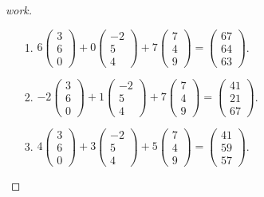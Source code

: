 \begin{question}{1.3}{}
{\begin{enumerate}
\begin{proof}[work]
\begin{enumerate}
          \item[1.] $6\begin{pmatrix}3 \\ 6 \\ 0\end{pmatrix} + 0\begin{pmatrix}-2 \\ 5 \\ 4\end{pmatrix} + 7\begin{pmatrix}7 \\ 4 \\ 9\end{pmatrix} = \begin{pmatrix}67 \\ 64 \\ 63\end{pmatrix}$.
          \item[2.] $-2\begin{pmatrix}3 \\ 6 \\ 0\end{pmatrix} + 1\begin{pmatrix}-2 \\ 5 \\ 4\end{pmatrix} + 7\begin{pmatrix}7 \\ 4 \\ 9\end{pmatrix} = \begin{pmatrix}41 \\ 21 \\ 67\end{pmatrix}$.
          \item[3.] $4\begin{pmatrix}3 \\ 6 \\ 0\end{pmatrix} + 3\begin{pmatrix}-2 \\ 5 \\ 4\end{pmatrix} + 5\begin{pmatrix}7 \\ 4 \\ 9\end{pmatrix} = \begin{pmatrix}41 \\ 59 \\ 57\end{pmatrix}$.

\end{enumerate}
\end{proof}
\end{enumerate}}
\end{question}
